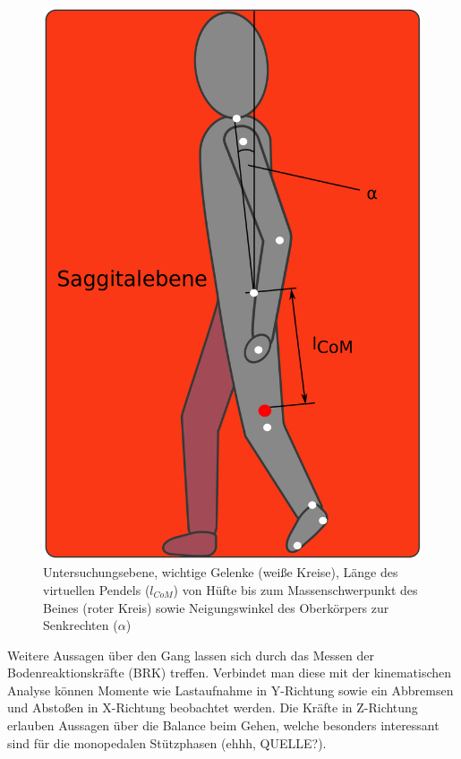 \begin{figure}
	\includegraphics[width=\linewidth]{bilder/Einleitung/Proband_Pendel}
	\caption[Inverses Pendel und untersuchte Gelenke]{Untersuchungsebene, wichtige Gelenke (weiße Kreise), Länge des virtuellen Pendels ($l_{CoM}$) von Hüfte bis zum Massenschwerpunkt des Beines (roter Kreis) sowie Neigungswinkel des Oberkörpers zur Senkrechten ($\alpha$)}
	\label{fig:Proband_Pendel}
\end{figure}
Weitere Aussagen über den Gang lassen sich durch das Messen der Bodenreaktionskräfte (BRK) treffen. Verbindet man diese mit der kinematischen Analyse können Momente wie Lastaufnahme in Y-Richtung sowie ein Abbremsen und Abstoßen in X-Richtung beobachtet werden. Die Kräfte in Z-Richtung erlauben Aussagen über die Balance beim Gehen, welche besonders interessant sind für die monopedalen Stützphasen (ehhh, QUELLE?).
